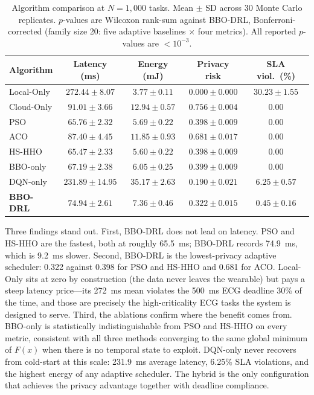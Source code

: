 \documentclass[journal]{IEEEtran}
\begin{document}
\begin{table}[t]
  \centering
  \caption{Algorithm comparison at $N = 1{,}000$ tasks. Mean $\pm$ SD
           across 30 Monte Carlo replicates. $p$-values are Wilcoxon
           rank-sum against BBO-DRL, Bonferroni-corrected (family
           size 20: five adaptive baselines $\times$ four metrics).
           All reported $p$-values are $< 10^{-3}$.}
  \label{tab:results}
  \renewcommand{\arraystretch}{1.15}
  \begin{tabular}{lcccc}
    \toprule
    \textbf{Algorithm} &
    \textbf{Latency (ms)} &
    \textbf{Energy (mJ)} &
    \textbf{Privacy risk} &
    \textbf{SLA viol.\ (\%)} \\
    \midrule
    Local-Only  & $272.44 \pm 8.07$  & $\mathbf{3.77 \pm 0.11}$ & $\mathbf{0.000 \pm 0.000}$ & $30.23 \pm 1.55$ \\
    Cloud-Only  & $91.01 \pm 3.66$   & $12.94 \pm 0.57$         & $0.756 \pm 0.004$         & $\mathbf{0.00}$ \\
    PSO         & $\mathbf{65.76 \pm 2.32}$ & $5.69 \pm 0.22$   & $0.398 \pm 0.009$         & $\mathbf{0.00}$ \\
    ACO         & $87.40 \pm 4.45$   & $11.85 \pm 0.93$         & $0.681 \pm 0.017$         & $\mathbf{0.00}$ \\
    HS-HHO      & $65.47 \pm 2.33$   & $5.60 \pm 0.22$          & $0.398 \pm 0.009$         & $\mathbf{0.00}$ \\
    BBO-only    & $67.19 \pm 2.38$   & $6.05 \pm 0.25$          & $0.399 \pm 0.009$         & $\mathbf{0.00}$ \\
    DQN-only    & $231.89 \pm 14.95$ & $35.17 \pm 2.63$         & $0.190 \pm 0.021$         & $6.25 \pm 0.57$ \\
    \textbf{BBO-DRL} & $74.94 \pm 2.61$ & $7.36 \pm 0.46$       & $\mathbf{0.322 \pm 0.015}$ & $0.45 \pm 0.16$ \\
    \bottomrule
  \end{tabular}
\end{table}

Three findings stand out. First, BBO-DRL does not lead on latency. PSO
and HS-HHO are the fastest, both at roughly 65.5~ms; BBO-DRL records
74.9~ms, which is 9.2~ms slower. Second, BBO-DRL is the lowest-privacy
adaptive scheduler: 0.322 against 0.398 for PSO and HS-HHO and 0.681
for ACO. Local-Only sits at zero by construction (the data never leaves
the wearable) but pays a steep latency price---its 272~ms mean violates
the 500~ms ECG deadline 30\% of the time, and those are precisely the
high-criticality ECG tasks the system is designed to serve. Third, the
ablations confirm where the benefit comes from. BBO-only is
statistically indistinguishable from PSO and HS-HHO on every metric,
consistent with all three methods converging to the same global minimum
of $F(x)$ when there is no temporal state to exploit. DQN-only never
recovers from cold-start at this scale: 231.9~ms average latency,
6.25\% SLA violations, and the highest energy of any adaptive
scheduler. The hybrid is the only configuration that achieves the
privacy advantage together with deadline compliance.
\end{document}
